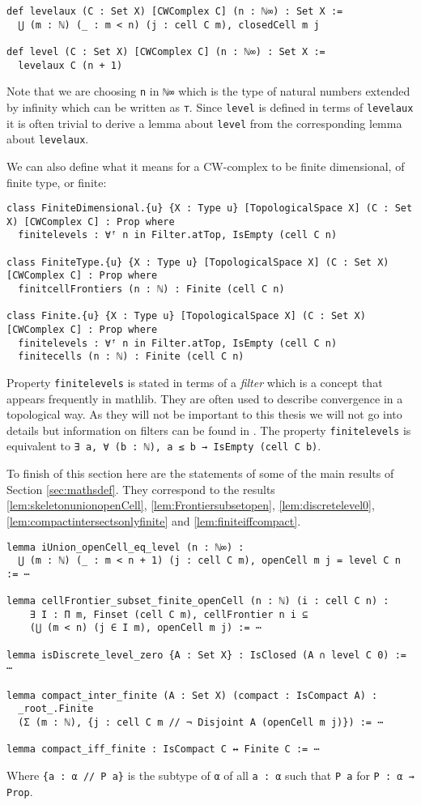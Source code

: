 \begin{lstlisting}
def levelaux (C : Set X) [CWComplex C] (n : ℕ∞) : Set X :=
  ⋃ (m : ℕ) (_ : m < n) (j : cell C m), closedCell m j

def level (C : Set X) [CWComplex C] (n : ℕ∞) : Set X :=
  levelaux C (n + 1)
\end{lstlisting}

Note that we are choosing \lstinline{n} in \lstinline{ℕ∞} which is the type of natural numbers extended by infinity which can be written as \lstinline{⊤}. 
Since \lstinline{level} is defined in terms of \lstinline{levelaux} it is often trivial to derive a lemma about \lstinline{level} from the corresponding lemma about \lstinline{levelaux}. 

We can also define what it means for a CW-complex to be finite dimensional, of finite type, or finite: 

\begin{lstlisting}
class FiniteDimensional.{u} {X : Type u} [TopologicalSpace X] (C : Set X) [CWComplex C] : Prop where
  finitelevels : ∀ᶠ n in Filter.atTop, IsEmpty (cell C n)

class FiniteType.{u} {X : Type u} [TopologicalSpace X] (C : Set X) [CWComplex C] : Prop where
  finitcellFrontiers (n : ℕ) : Finite (cell C n)

class Finite.{u} {X : Type u} [TopologicalSpace X] (C : Set X) [CWComplex C] : Prop where
  finitelevels : ∀ᶠ n in Filter.atTop, IsEmpty (cell C n)
  finitecells (n : ℕ) : Finite (cell C n)
\end{lstlisting}

Property \lstinline{finitelevels} is stated in terms of a \emph{filter} which is a concept that appears frequently in mathlib.
They are often used to describe convergence in a topological way. 
As they will not be important to this thesis we will not go into details but information on filters can be found in \cite{Bourbaki1966}. 
The property \lstinline{finitelevels} is equivalent to \lstinline{∃ a, ∀ (b : ℕ), a ≤ b → IsEmpty (cell C b)}. 

To finish of this section here are the statements of some of the main results of Section \ref{sec:mathsdef}.
They correspond to the results \ref{lem:skeletonunionopenCell}, \ref{lem:Frontiersubsetopen}, \ref{lem:discretelevel0}, \ref{lem:compactintersectsonlyfinite} and \ref{lem:finiteiffcompact}.

\begin{lstlisting}
lemma iUnion_openCell_eq_level (n : ℕ∞) :
  ⋃ (m : ℕ) (_ : m < n + 1) (j : cell C m), openCell m j = level C n := ⋯

lemma cellFrontier_subset_finite_openCell (n : ℕ) (i : cell C n) : 
    ∃ I : Π m, Finset (cell C m), cellFrontier n i ⊆ 
    (⋃ (m < n) (j ∈ I m), openCell m j) := ⋯

lemma isDiscrete_level_zero {A : Set X} : IsClosed (A ∩ level C 0) := ⋯

lemma compact_inter_finite (A : Set X) (compact : IsCompact A) :
  _root_.Finite 
  (Σ (m : ℕ), {j : cell C m // ¬ Disjoint A (openCell m j)}) := ⋯

lemma compact_iff_finite : IsCompact C ↔ Finite C := ⋯
\end{lstlisting}

Where \lstinline|{a : α // P a}| is the subtype of \lstinline{α} of all \lstinline{a : α} such that \lstinline{P a} for \lstinline{P : α → Prop}.